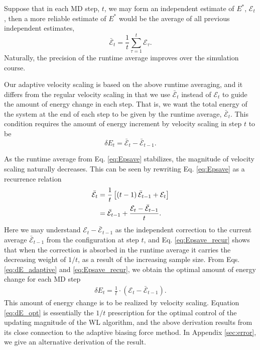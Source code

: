 \documentclass[reprint]{revtex4-1}
\begin{document}
Suppose that in each MD step, $t$,
we may form an independent estimate of $E^*$,
$\mathcal E_t$,
then a more reliable estimate of $E^*$
would be the average of
all previous independent estimates,
%
\begin{equation}
  \bar{\mathcal E}_t
  =
  \frac 1 t
  \sum_{\tau = 1}^t
    \mathcal E_\tau
  .
  \label{eq:Epsave}
\end{equation}
%
Naturally, the precision of the runtime average
improves over the simulation course.



Our adaptive velocity scaling is based on
the above runtime averaging,
and it differs from the regular velocity scaling
in that we use $\bar{\mathcal E}_t$
instead of $\mathcal E_t$
to guide the amount of energy change in each step.
%
That is, we want
the total energy of the system
at the end of each step
to be given by
the runtime average, $\bar{\mathcal E}_t$.
%
This condition requires the amount of energy increment
by velocity scaling in step $t$ to be
%
\begin{equation}
  \delta E_t
  =
  \bar{\mathcal E}_t - \bar{\mathcal E}_{t - 1}
  .
  \label{eq:dE_adaptive}
\end{equation}

As the runtime average from Eq. \eqref{eq:Epsave}
stabilizes, the magnitude of velocity scaling
naturally decreases.
%
This can be seen by rewriting Eq. \eqref{eq:Epsave}
as a recurrence relation
%
\begin{align}
  \bar{\mathcal E}_t
  &=
  \frac{1}{t}
  \left[
    (t - 1) \, \bar{\mathcal E}_{t - 1}
    + \mathcal E_t
  \right]
  \notag \\
  &=
  \bar{\mathcal E}_{t - 1}
  +
  \frac{
    \mathcal E_t - \bar{\mathcal E}_{t - 1}
  }
  {
    t
  }
  .
\label{eq:Epsave_recur}
\end{align}
%
Here we may understand $\mathcal E_t - \bar{\mathcal E}_{t - 1}$
as the independent correction
to the current average $\bar{\mathcal E}_{t - 1}$
from the configuration at step $t$,
and Eq. \eqref{eq:Epsave_recur} shows that
when the correction is absorbed in the runtime average
it carries the decreasing weight of $1/t$,
as a result of the increasing sample size.
%
From Eqs. \eqref{eq:dE_adaptive} and \eqref{eq:Epsave_recur},
we obtain the optimal amount of energy change
for each MD step
\begin{align}
  \delta E_t
  =
  \frac{ 1 } { t }
  \cdot
  \left( \mathcal E_t - \bar{\mathcal E}_{t - 1} \right)
  .
  \label{eq:dE_opt}
\end{align}
%
This amount of energy change is to be realized by velocity scaling.
%
Equation \eqref{eq:dE_opt} is essentially
the $1/t$ prescription\cite{
  belardinelli2007, *belardinelli2007jcp, *belardinelli2008,
  zhou2005, *zhou2008, *morozov2007}
for the optimal control of the updating magnitude
of the WL algorithm\cite{wang2001, *wang2001pre},
and the above derivation results from its close connection\cite{
  marsili2006, barducci2008}
to the adaptive biasing force method\cite{darve2001, *darve2008}.
%
In Appendix \ref{sec:error}, we give an alternative derivation of the result.
\end{document}

